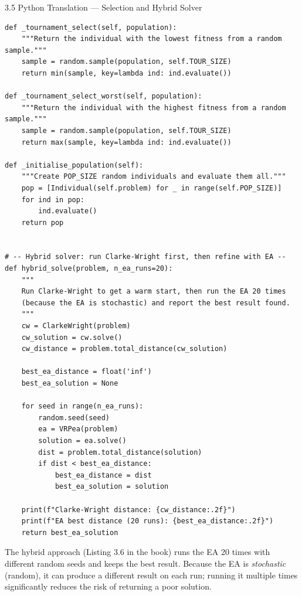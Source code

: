 \documentclass[aspectratio=169,10pt]{beamer}
\begin{document}
\begin{frame}[fragile]{3.5 Python Translation — Selection and Hybrid Solver}

  \begin{lstlisting}[style=pythonstyle,caption={Python: tournament selection and hybrid solver}]
def _tournament_select(self, population):
    """Return the individual with the lowest fitness from a random sample."""
    sample = random.sample(population, self.TOUR_SIZE)
    return min(sample, key=lambda ind: ind.evaluate())

def _tournament_select_worst(self, population):
    """Return the individual with the highest fitness from a random sample."""
    sample = random.sample(population, self.TOUR_SIZE)
    return max(sample, key=lambda ind: ind.evaluate())

def _initialise_population(self):
    """Create POP_SIZE random individuals and evaluate them all."""
    pop = [Individual(self.problem) for _ in range(self.POP_SIZE)]
    for ind in pop:
        ind.evaluate()
    return pop


# -- Hybrid solver: run Clarke-Wright first, then refine with EA --
def hybrid_solve(problem, n_ea_runs=20):
    """
    Run Clarke-Wright to get a warm start, then run the EA 20 times
    (because the EA is stochastic) and report the best result found.
    """
    cw = ClarkeWright(problem)
    cw_solution = cw.solve()
    cw_distance = problem.total_distance(cw_solution)

    best_ea_distance = float('inf')
    best_ea_solution = None

    for seed in range(n_ea_runs):
        random.seed(seed)
        ea = VRPea(problem)
        solution = ea.solve()
        dist = problem.total_distance(solution)
        if dist < best_ea_distance:
            best_ea_distance = dist
            best_ea_solution = solution

    print(f"Clarke-Wright distance: {cw_distance:.2f}")
    print(f"EA best distance (20 runs): {best_ea_distance:.2f}")
    return best_ea_solution
  \end{lstlisting}

  The hybrid approach (Listing 3.6 in the book) runs the EA 20 times with different random seeds
  and keeps the best result.
  Because the EA is \emph{stochastic} (random), it can produce a different result on each run;
  running it multiple times significantly reduces the risk of returning a poor solution.

\end{frame}
\end{document}
